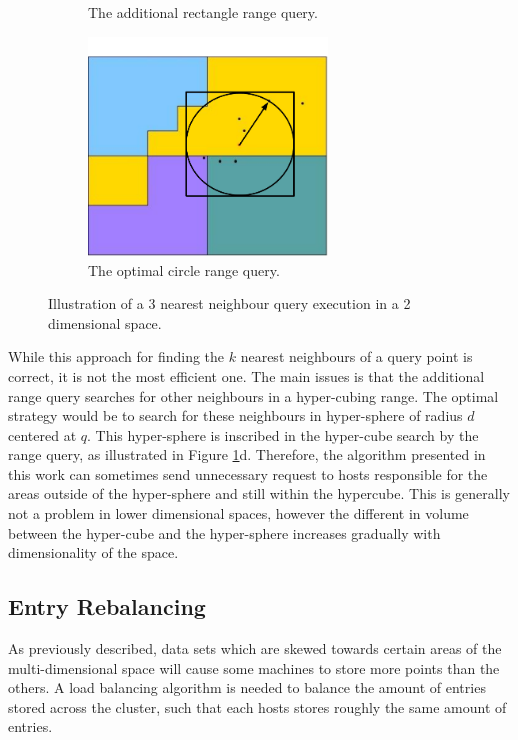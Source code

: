 \documentclass[11pt,a4paper]{globis-book}
\begin{document}
\begin{figure}[h]
\begin{subfigure}[b]{0.4\linewidth}
        \caption{The additional rectangle range query.}
    \end{subfigure}%
    \qquad
    \begin{subfigure}[b]{0.4\linewidth}
        \includegraphics[width = 2.5in]{images/zordering-knn-d}
        \caption{The optimal circle range query.}
    \end{subfigure}
    \caption{Illustration of a 3 nearest neighbour query execution in a 2 dimensional space. }
    \label{fig:knn}
\end{figure}

While this approach for finding the $k$ nearest neighbours of a query point is correct, it is not the most efficient one. The main issues is that the additional range query searches for other neighbours in a hyper-cubing range. The optimal strategy would be to search for these neighbours in hyper-sphere of radius $d$ centered at $q$. This hyper-sphere is inscribed in the hyper-cube search by the range query, as illustrated in Figure \ref{fig:knn}d. Therefore, the algorithm presented in this work can sometimes send unnecessary request to hosts responsible for the areas outside of the hyper-sphere and still within the hypercube. This is generally not a problem in lower dimensional spaces, however the different in volume between the hyper-cube and the hyper-sphere increases gradually with dimensionality of the space. 

\subsection{Entry Rebalancing}

As previously described, data sets which are skewed towards certain areas of the multi-dimensional space will cause some machines to store more points than the others. A load balancing algorithm is needed to balance the amount of entries stored across the cluster, such that each hosts stores roughly the same amount of entries. 
\end{document}
